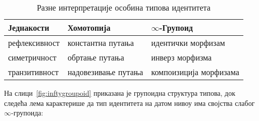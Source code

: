 \documentclass[12pt,oneside]{memoir}
\begin{document}
\begin{table}
    \begin{center}
        \begin{tabular}[c]{l l l}
            Једнакости & Хомотопија & $\infty$-Групоид \\
            \hline%
            рефлексивност & константна путања & идентички морфизам \\
            симетричност & обртање путања & инверз морфизма \\
            транзитивност & надовезивање путања & компоизиција морфизама\\
        \end{tabular}
    \end{center}
    \caption{Разне интерпретације особина типова идентитета}
    \label{table:inftygroupoid}
\end{table}

На слици~\ref{fig:inftygroupoid} приказана је групоидна структура типова, док следећа лема карактерише да тип идентитета на датом нивоу има својства слабог $\infty$-групоида:
\end{document}
